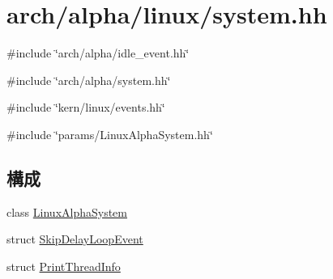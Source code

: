 \hypertarget{arch_2alpha_2linux_2system_8hh}{
\section{arch/alpha/linux/system.hh}
\label{arch_2alpha_2linux_2system_8hh}
}
{\ttfamily \#include \char`\"{}arch/alpha/idle\_\-event.hh\char`\"{}}\par
{\ttfamily \#include \char`\"{}arch/alpha/system.hh\char`\"{}}\par
{\ttfamily \#include \char`\"{}kern/linux/events.hh\char`\"{}}\par
{\ttfamily \#include \char`\"{}params/LinuxAlphaSystem.hh\char`\"{}}\par
\subsection*{構成}
\begin{DoxyCompactItemize}
\item 
class \hyperlink{classLinuxAlphaSystem}{LinuxAlphaSystem}
\item 
struct \hyperlink{structLinuxAlphaSystem_1_1SkipDelayLoopEvent}{SkipDelayLoopEvent}
\item 
struct \hyperlink{structLinuxAlphaSystem_1_1PrintThreadInfo}{PrintThreadInfo}
\end{DoxyCompactItemize}
